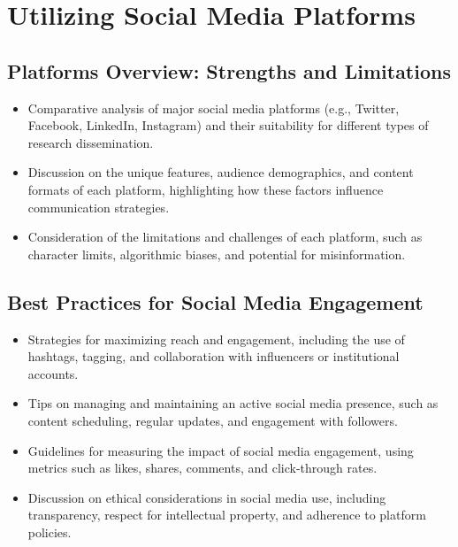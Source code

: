 \documentclass[
]{book}
\begin{document}
\hypertarget{utilizing-social-media-platforms}{%
\section*{Utilizing Social Media Platforms}\label{utilizing-social-media-platforms}}

\hypertarget{platforms-overview-strengths-and-limitations}{%
\subsection*{Platforms Overview: Strengths and Limitations}\label{platforms-overview-strengths-and-limitations}}

\begin{itemize}
\item
  Comparative analysis of major social media platforms (e.g., Twitter, Facebook, LinkedIn, Instagram) and their suitability for different types of research dissemination.
\item
  Discussion on the unique features, audience demographics, and content formats of each platform, highlighting how these factors influence communication strategies.
\item
  Consideration of the limitations and challenges of each platform, such as character limits, algorithmic biases, and potential for misinformation.
\end{itemize}

\hypertarget{best-practices-for-social-media-engagement}{%
\subsection*{Best Practices for Social Media Engagement}\label{best-practices-for-social-media-engagement}}

\begin{itemize}
\item
  Strategies for maximizing reach and engagement, including the use of hashtags, tagging, and collaboration with influencers or institutional accounts.
\item
  Tips on managing and maintaining an active social media presence, such as content scheduling, regular updates, and engagement with followers.
\item
  Guidelines for measuring the impact of social media engagement, using metrics such as likes, shares, comments, and click-through rates.
\item
  Discussion on ethical considerations in social media use, including transparency, respect for intellectual property, and adherence to platform policies.
\end{itemize}
\end{document}
